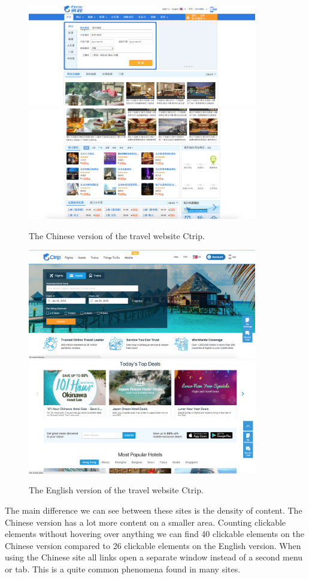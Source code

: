 \begin{figure}[h]
\centering
\includegraphics[width=100mm]{Images/ctrip_chinese1}
\includegraphics[width=100mm]{Images/ctrip_chinese2}
\decoRule
\caption[Chinese version of Ctrip]{The Chinese version of the travel website Ctrip.}
\label{fig:ctrip_chinese}
\end{figure}

\begin{figure}[h]
\centering
\includegraphics[width=100mm]{Images/ctrip_eng1}
\includegraphics[width=100mm]{Images/ctrip_eng2}
\decoRule
\caption[English version of Ctrip]{The English version of the travel website Ctrip.}
\label{fig:ctrip_english}
\end{figure}
 The main difference we can see between these sites is the density of content. The Chinese version has a lot more content on a smaller area. Counting clickable elements without hovering over anything we can find 40 clickable elements on the Chinese version compared to 26 clickable elements on the English version. When using the Chinese site all links open a separate window instead of a second menu or tab. This is a quite common phenomena found in many sites.
 
